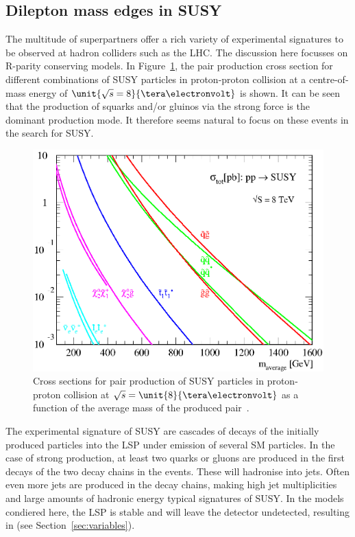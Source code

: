\subsection{Dilepton mass edges in SUSY}
\label{sec:edges}
The multitude of superpartners offer a rich variety of experimental signatures to be observed at hadron colliders such as the LHC. The discussion here focusses on R-parity conserving models. In Figure~\ref{fig:SUSYXSecs}, the pair production cross section for different combinations of SUSY particles in proton-proton collision at a centre-of-mass energy of $\unit{\sqrt{s}=8}{\tera\electronvolt}$ is shown. It can be seen that the production of squarks and/or gluinos via the strong force is the dominant production mode. It therefore seems natural to focus on these events in the search for SUSY.
\begin{figure}
\centering
\includegraphics[scale=0.6]{plots/THEO/prospino_lhc8.eps}
\caption{Cross sections for pair production of SUSY particles in proton-proton collision at $\sqrt{s} = \unit{8}{\tera\electronvolt}$ as a function of the average mass of the produced pair~\cite{ProspinoPlot,Beenakker:1999xh,Beenakker:1997ut,bib-nlo-nll-01}.}
\label{fig:SUSYXSecs}
\end{figure}

The experimental signature of SUSY are cascades of decays of the initially produced particles into the LSP under emission of several SM particles. In the case of strong production, at least two quarks or gluons are produced in the first decays of the two decay chains in the events. These will hadronise into jets. Often even more jets are produced in the decay chains, making high jet multiplicities and large amounts of hadronic energy typical signatures of SUSY. In the models condiered here, the LSP is stable and will leave the detector undetected, resulting in \MET (see Section~\ref{sec:variables}).


